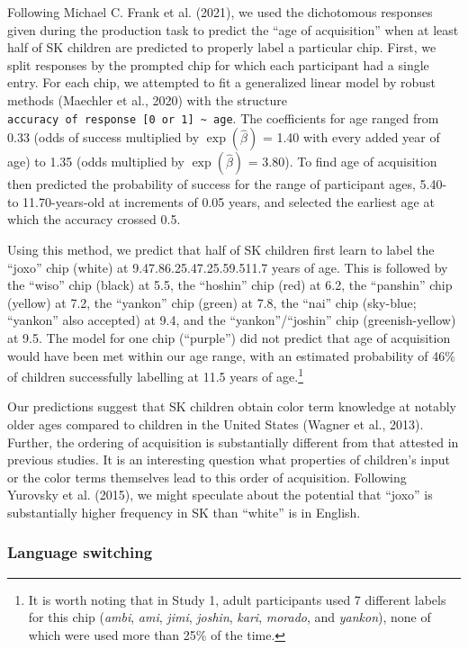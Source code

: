 \documentclass[
  english,
  ,apa7,floatsintext]{apa6}
\begin{document}
Following Michael C. Frank et al. (2021), we used the dichotomous responses given during the production task to predict the ``age of acquisition'' when at least half of SK children are predicted to properly label a particular chip. First, we split responses by the prompted chip for which each participant had a single entry. For each chip, we attempted to fit a generalized linear model by robust methods (Maechler et al., 2020) with the structure \texttt{accuracy\ of\ response\ {[}0\ or\ 1{]}\ \textasciitilde{}\ age}. The coefficients for age ranged from 0.33 (odds of success multiplied by \(\exp{(\hat{\beta})}\) = 1.40 with every added year of age) to 1.35 (odds multiplied by \(\exp{(\hat{\beta})}\) = 3.80). To find age of acquisition then predicted the probability of success for the range of participant ages, 5.40- to 11.70-years-old at increments of 0.05 years, and selected the earliest age at which the accuracy crossed 0.5.

Using this method, we predict that half of SK children first learn to label the ``joxo'' chip (white) at 9.47.86.25.47.25.59.511.7 years of age. This is followed by the ``wiso'' chip (black) at 5.5, the ``hoshin'' chip (red) at 6.2, the ``panshin'' chip (yellow) at 7.2, the ``yankon'' chip (green) at 7.8, the ``nai'' chip (sky-blue; ``yankon'' also accepted) at 9.4, and the ``yankon''/``joshin'' chip (greenish-yellow) at 9.5. The model for one chip (``purple'') did not predict that age of acquisition would have been met within our age range, with an estimated probability of 46\% of children successfully labelling at 11.5 years of age.\footnote{It is worth noting that in Study 1, adult participants used 7 different labels for this chip (\emph{ambi}, \emph{ami}, \emph{jimi}, \emph{joshin}, \emph{kari}, \emph{morado}, and \emph{yankon}), none of which were used more than 25\% of the time.}

Our predictions suggest that SK children obtain color term knowledge at notably older ages compared to children in the United States (Wagner et al., 2013). Further, the ordering of acquisition is substantially different from that attested in previous studies. It is an interesting question what properties of children's input or the color terms themselves lead to this order of acquisition. Following Yurovsky et al. (2015), we might speculate about the potential that ``joxo'' is substantially higher frequency in SK than ``white'' is in English.

\hypertarget{language-switching}{%
\subsubsection{Language switching}\label{language-switching}}
\end{document}

